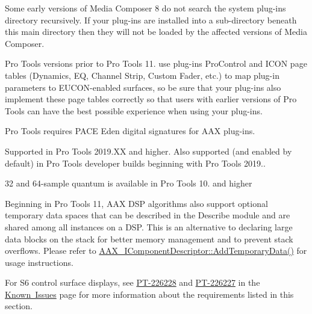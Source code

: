 \begin{DoxyRefList}
\item[Module \mbox{\hyperlink{a00929}{AAX\+\_\+\+Media\+\_\+\+Composer\+\_\+\+Guide}} ]\label{a00879__compatibility_notes000009}%
%
 Some early versions of Media Composer 8 do not search the system plug-\/ins directory recursively. If your plug-\/ins are installed into a sub-\/directory beneath this main directory then they will not be loaded by the affected versions of Media Composer. 
\item[Module \mbox{\hyperlink{a00931}{AAX\+\_\+\+Page\+\_\+\+Table\+\_\+\+Guide}} ]\label{a00879__compatibility_notes000010}%
%
 Pro Tools versions prior to Pro Tools 11. use plug-\/ins\textquotesingle{} Pro\+Control and ICON page tables (Dynamics, EQ, Channel Strip, Custom Fader, etc.) to map plug-\/in parameters to EUCON-\/enabled surfaces, so be sure that your plug-\/ins also implement these page tables correctly so that users with earlier versions of Pro Tools can have the best possible experience when using your plug-\/ins. 
\item[Module \mbox{\hyperlink{a00928}{AAX\+\_\+\+Pro\+\_\+\+Tools\+\_\+\+Guide}} ]\label{a00879__compatibility_notes000011}%
%
 Pro Tools requires PACE Eden digital signatures for AAX plug-\/ins.

\label{a00879__compatibility_notes000012}%
%
 Supported in Pro Tools 2019.\+XX and higher. Also supported (and enabled by default) in Pro Tools developer builds beginning with Pro Tools 2019.. 
\item[Module \mbox{\hyperlink{a00930}{AAX\+\_\+\+TI\+\_\+\+Guide}} ]\label{a00879__compatibility_notes000016}%
%
 32 and 64-\/sample quantum is available in Pro Tools 10. and higher

\label{a00879__compatibility_notes000017}%
%
 Beginning in Pro Tools 11, AAX DSP algorithms also support optional temporary data spaces that can be described in the Describe module and are shared among all instances on a DSP. This is an alternative to declaring large data blocks on the stack for better memory management and to prevent stack overflows. Please refer to \mbox{\hyperlink{a02216_ad8daad601b60fdbd6134fe0c8faa2fc4}{AAX\+\_\+\+IComponent\+Descriptor\+::\+Add\+Temporary\+Data()}} for usage instructions. 
\item[Module \mbox{\hyperlink{a00901}{Additional\+Features\+\_\+\+Curve\+Displays}} ]\label{a00879__compatibility_notes000001}%
%
 For S6 control surface displays, see \mbox{\hyperlink{a00944_PT-226228}{PT-\/226228}} and \mbox{\hyperlink{a00944_PT-226227}{PT-\/226227}} in the \mbox{\hyperlink{a00944}{Known Issues}} page for more information about the requirements listed in this section. 
\item[Module \mbox{\hyperlink{a00924}{advanced\+Topics\+\_\+related\+Types}} ]\label{a00879__compatibility_notes000014}%
%



\end{DoxyRefList}
